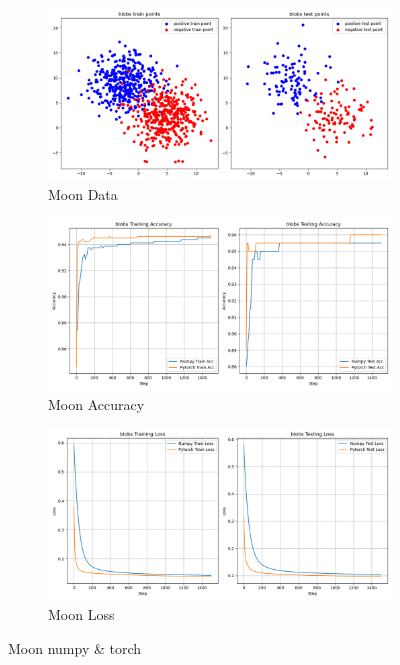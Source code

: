 \documentclass{article}
\begin{document}
\begin{appendix}
\begin{figure}[!htbp]
  \centering
  \begin{subfigure}[b]{0.85\textwidth}
    \includegraphics[width=\textwidth]{img/Part1/data_blobs.png}
    \caption{Moon Data}
  \end{subfigure}
  \begin{subfigure}[b]{0.90\textwidth}
    \includegraphics[width=\textwidth]{img/Part1/acc_blobs.png}
    \caption{Moon Accuracy}
  \end{subfigure}
  \begin{subfigure}[b]{0.90\textwidth}
    \includegraphics[width=\textwidth]{img/Part1/loss_blobs.png}
    \caption{Moon Loss}
  \end{subfigure}
  \caption{Moon numpy \& torch}
  \label{fig:p1t1_blobs}
\end{figure}


\end{appendix}
\end{document}
